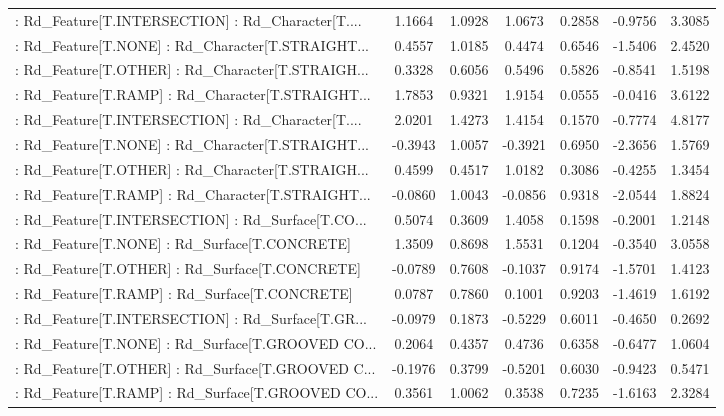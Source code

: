 \begin{longtable}{p{4cm}cccccc}
 : Rd\_Feature[T.INTERSECTION] : Rd\_Character[T.... &  1.1664 &    1.0928 &  1.0673 &       0.2858 & -0.9756 &  3.3085 \\
 : Rd\_Feature[T.NONE] : Rd\_Character[T.STRAIGHT... &  0.4557 &    1.0185 &  0.4474 &       0.6546 & -1.5406 &  2.4520 \\
 : Rd\_Feature[T.OTHER] : Rd\_Character[T.STRAIGH... &  0.3328 &    0.6056 &  0.5496 &       0.5826 & -0.8541 &  1.5198 \\
 : Rd\_Feature[T.RAMP] : Rd\_Character[T.STRAIGHT... &  1.7853 &    0.9321 &  1.9154 &       0.0555 & -0.0416 &  3.6122 \\
 : Rd\_Feature[T.INTERSECTION] : Rd\_Character[T.... &  2.0201 &    1.4273 &  1.4154 &       0.1570 & -0.7774 &  4.8177 \\
 : Rd\_Feature[T.NONE] : Rd\_Character[T.STRAIGHT... & -0.3943 &    1.0057 & -0.3921 &       0.6950 & -2.3656 &  1.5769 \\
 : Rd\_Feature[T.OTHER] : Rd\_Character[T.STRAIGH... &  0.4599 &    0.4517 &  1.0182 &       0.3086 & -0.4255 &  1.3454 \\
 : Rd\_Feature[T.RAMP] : Rd\_Character[T.STRAIGHT... & -0.0860 &    1.0043 & -0.0856 &       0.9318 & -2.0544 &  1.8824 \\
 : Rd\_Feature[T.INTERSECTION] : Rd\_Surface[T.CO... &  0.5074 &    0.3609 &  1.4058 &       0.1598 & -0.2001 &  1.2148 \\
 : Rd\_Feature[T.NONE] : Rd\_Surface[T.CONCRETE]     &  1.3509 &    0.8698 &  1.5531 &       0.1204 & -0.3540 &  3.0558 \\
 : Rd\_Feature[T.OTHER] : Rd\_Surface[T.CONCRETE]    & -0.0789 &    0.7608 & -0.1037 &       0.9174 & -1.5701 &  1.4123 \\
 : Rd\_Feature[T.RAMP] : Rd\_Surface[T.CONCRETE]     &  0.0787 &    0.7860 &  0.1001 &       0.9203 & -1.4619 &  1.6192 \\
 : Rd\_Feature[T.INTERSECTION] : Rd\_Surface[T.GR... & -0.0979 &    0.1873 & -0.5229 &       0.6011 & -0.4650 &  0.2692 \\
 : Rd\_Feature[T.NONE] : Rd\_Surface[T.GROOVED CO... &  0.2064 &    0.4357 &  0.4736 &       0.6358 & -0.6477 &  1.0604 \\
 : Rd\_Feature[T.OTHER] : Rd\_Surface[T.GROOVED C... & -0.1976 &    0.3799 & -0.5201 &       0.6030 & -0.9423 &  0.5471 \\
 : Rd\_Feature[T.RAMP] : Rd\_Surface[T.GROOVED CO... &  0.3561 &    1.0062 &  0.3538 &       0.7235 & -1.6163 &  2.3284 \\

\end{longtable}

